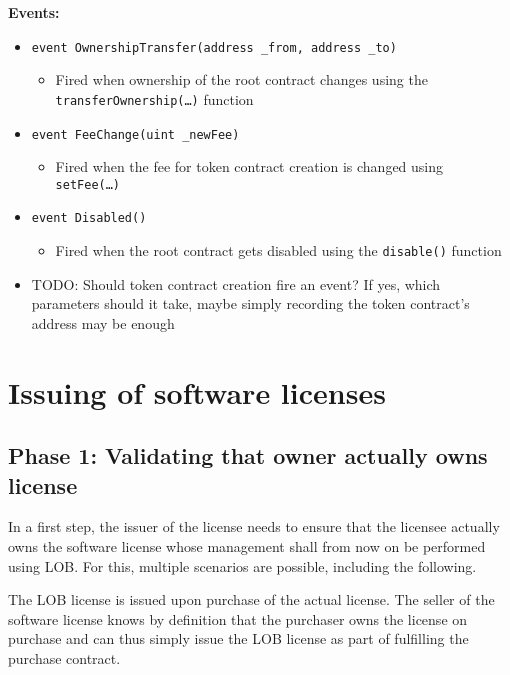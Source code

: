 \documentclass[a4paper]{article}
\newcommand{\todo}[1]{\textsf{TODO: #1}}
\begin{document}
\textbf{Events:}

\begin{itemize}
  \item \texttt{event OwnershipTransfer(address \_from, address \_to)}
  \begin{itemize}
    \item Fired when ownership of the root contract changes using the \texttt{transferOwnership(…)} function
  \end{itemize}
  
  \item \texttt{event FeeChange(uint \_newFee)}
  \begin{itemize}
    \item Fired when the fee for token contract creation is changed using \texttt{setFee(…)}
  \end{itemize}
  
  \item \texttt{event Disabled()}
  \begin{itemize}
    \item Fired when the root contract gets disabled using the \texttt{disable()} function
  \end{itemize}
  
  \item \todo{Should token contract creation fire an event? If yes, which parameters should it take, maybe simply recording the token contract's address may be enough}
\end{itemize}

\section{Issuing of software licenses}

\subsection{Phase 1: Validating that owner actually owns license}

In a first step, the issuer of the license needs to ensure that the licensee actually owns the software license whose management shall from now on be performed using LOB. For this, multiple scenarios are possible, including the following.

The LOB license is issued upon purchase of the actual license. The seller of the software license knows by definition that the purchaser owns the license on purchase and can thus simply issue the LOB license as part of fulfilling the purchase contract.
\end{document}
